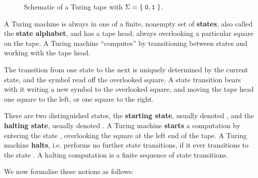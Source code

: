 
\begin{figure}[h!]
\centering
{}
\caption[]{Schematic of a Turing tape with $\Sigma=\mathopen{}\left\{\mathrel{}{\mathtt{0},\mathtt{1}}\mathrel{}\right\}\mathclose{}$.}
\label{fig:turing-tape}
\end{figure}

A Turing machine is always in one of a finite, nonempty set of \textbf{states},
also called the \textbf{state alphabet}, and has a tape head, always
overlooking a particular square on the tape. A Turing machine ``computes'' by
transitioning between states and working with the tape head.

The transition from one state to the next is uniquely determined by the current
state, and the symbol read off the overlooked square. A state transition bears
with it writing a new symbol to the overlooked square, and moving the tape head
one square to the left, or one square to the right.

There are two distinguished states, the \textbf{starting state}, usually
denoted \qstart, and the \textbf{halting state}, usually denoted \qhalt. A
Turing machine \textbf{starts} a computation by entering the state \qstart,
overlooking the square at the left end of the tape. A Turing machine
\textbf{halts}, i.e.  performs no further state transitions, if it ever
transitions to the state \qhalt. A halting computation is a finite sequence of
state transitions.

We now formalise these notions as follows:

